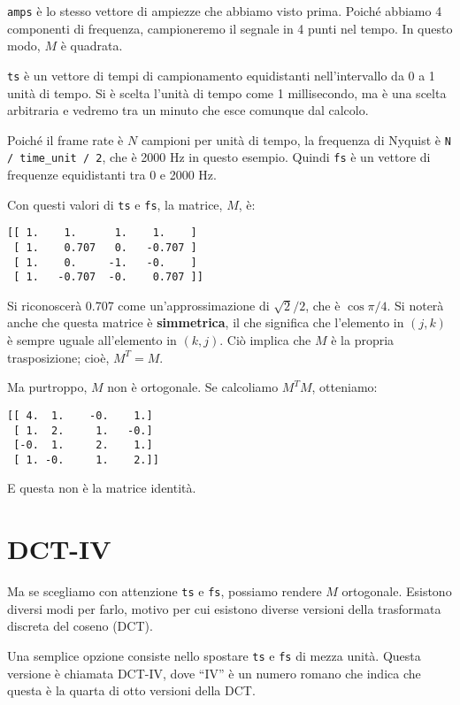 \documentclass[12pt,a4paper]{book}
\begin{document}
{\tt amps} è lo stesso vettore di ampiezze che abbiamo visto prima. Poiché abbiamo 4 componenti di frequenza, campioneremo il segnale in 4 punti nel tempo. In questo modo, $M$ è quadrata.

{\tt ts} è un vettore di tempi di campionamento equidistanti nell'intervallo da 0 a 1 unità di tempo. Si è scelta l'unità di tempo come 1 millisecondo, ma è una scelta arbitraria e vedremo tra un minuto che esce comunque dal calcolo.

Poiché il frame rate è $N$ campioni per unità di tempo, la frequenza di Nyquist è \verb"N / time_unit / 2", che è 2000 Hz in questo esempio. Quindi {\tt fs} è un vettore di frequenze equidistanti tra 0 e 2000 Hz.

Con questi valori di {\tt ts} e {\tt fs}, la matrice, $M$, è:

\begin{verbatim} 
[[ 1.    1.      1.    1.    ]
 [ 1.    0.707   0.   -0.707 ] 
 [ 1.    0.     -1.   -0.    ]
 [ 1.   -0.707  -0.    0.707 ]]
 \end{verbatim} 

Si riconoscerà 0.707 come un'approssimazione di $\sqrt{2}/2$, che è $\cos \pi/4$. Si noterà anche che questa matrice è {\bf simmetrica}, il che significa che l'elemento in $(j, k)$ è sempre uguale all'elemento in $(k, j)$. Ciò implica che $M$ è la propria trasposizione; cioè, $M^T = M$.

Ma purtroppo, $M$ non è ortogonale. Se calcoliamo $M^TM$, otteniamo:

\begin{verbatim} 
[[ 4.  1.    -0.    1.]
 [ 1.  2.     1.   -0.]
 [-0.  1.     2.    1.]
 [ 1. -0.     1.    2.]]
 \end{verbatim} 

E questa non è la matrice identità.

\section{DCT-IV} \label{dctiv} 

Ma se scegliamo con attenzione {\tt ts} e {\tt fs}, possiamo rendere $M$ ortogonale. Esistono diversi modi per farlo, motivo per cui esistono diverse versioni della trasformata discreta del coseno (DCT).

Una semplice opzione consiste nello spostare {\tt ts} e {\tt fs} di mezza unità. Questa versione è chiamata DCT-IV, dove ``IV'' è un numero romano che indica che questa è la quarta di otto versioni della DCT.
\end{document}
